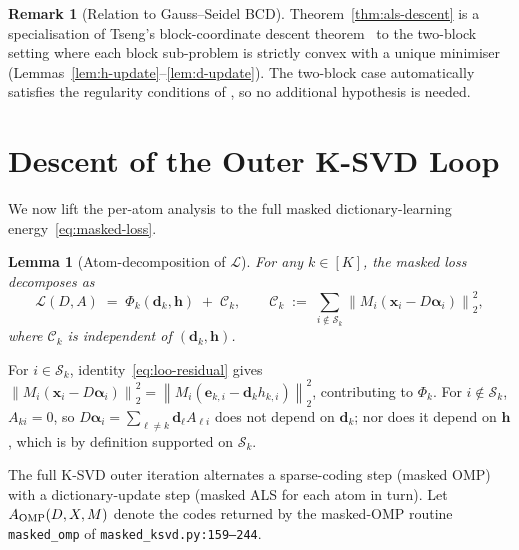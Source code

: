 \documentclass[journal,onecolumn,11pt]{IEEEtran}
\newtheorem{lemma}[theorem]{Lemma}
\theoremstyle{definition}
\newtheorem{remark}{Remark}
\newcommand{\Loss}{\mathcal{L}}
\newcommand{\norm}[1]{\left\lVert #1 \right\rVert}
\newcommand{\Sk}{\mathcal{S}_k}
\newcommand{\dvec}{\bm{d}}
\newcommand{\hvec}{\bm{h}}
\newcommand{\xvec}{\bm{x}}
\newcommand{\alphavec}{\bm{\alpha}}
\begin{document}
\begin{remark}[Relation to Gauss--Seidel BCD]
Theorem~\ref{thm:als-descent} is a specialisation of Tseng's
block-coordinate descent theorem~\cite{tseng2001convergence} to the
two-block setting where each block sub-problem is strictly convex with a
unique minimiser (Lemmas~\ref{lem:h-update}--\ref{lem:d-update}).
The two-block case automatically satisfies the regularity conditions of
\cite{tseng2001convergence}, so no additional hypothesis is needed.
\end{remark}

\section{Descent of the Outer K-SVD Loop}

We now lift the per-atom analysis to the full masked dictionary-learning
energy~\eqref{eq:masked-loss}.

\begin{lemma}[Atom-decomposition of $\Loss$]
\label{lem:decomp}
For any $k\in[K]$, the masked loss decomposes as
\begin{equation}
\Loss(D,A)
\;=\;
\Phi_k(\dvec_k,\hvec) \;+\; \mathcal{C}_k,
\qquad
\mathcal{C}_k\;:=\;\sum_{i\notin\Sk}\norm{M_i(\xvec_i-D\alphavec_i)}_2^2,
\label{eq:atom-decomp}
\end{equation}
where $\mathcal{C}_k$ is independent of $(\dvec_k,\hvec)$.
\end{lemma}
\begin{IEEEproof}
For $i\in\Sk$, identity~\eqref{eq:loo-residual} gives
$\norm{M_i(\xvec_i-D\alphavec_i)}_2^2=\norm{M_i(\bm{e}_{k,i}-\dvec_k h_{k,i})}_2^2$,
contributing to $\Phi_k$. For $i\notin\Sk$, $A_{ki}=0$, so
$D\alphavec_i=\sum_{\ell\neq k}\dvec_\ell A_{\ell i}$ does not depend on
$\dvec_k$; nor does it depend on $\hvec$, which is by definition supported
on $\Sk$.
\end{IEEEproof}

The full K-SVD outer iteration alternates a sparse-coding step
(masked OMP) with a dictionary-update step (masked ALS for each atom in
turn). Let $A_{\rm OMP}(D,X,M)$ denote the codes returned by the
masked-OMP routine \texttt{masked\_omp} of \texttt{masked\_ksvd.py:159--244}.
\end{document}
